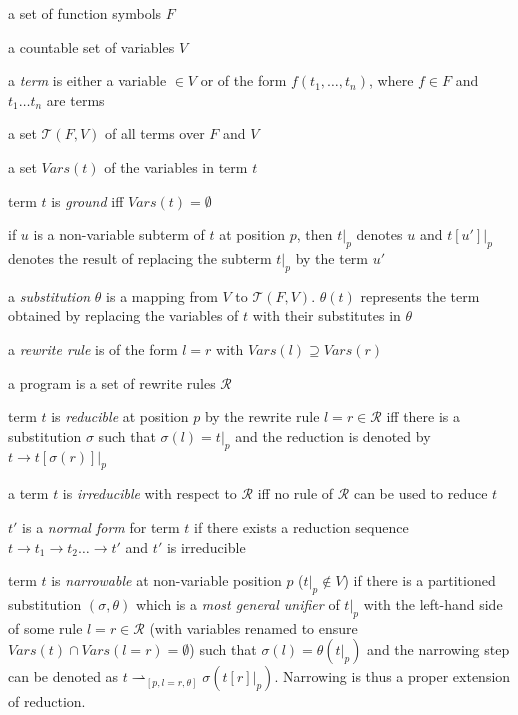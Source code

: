 \begin{list}{}{\setlength{\itemsep}{0cm}}
\item{a set of function symbols $F$}
\item{a countable set of variables $V$}
\item{a \textit{term} is either a variable $\in V$ or
  of the form $f(t_1,\ldots,t_n)$, where $f \in F$ and
  $t_1 \ldots t_n$ are terms}
\item{a set $\mathcal{T}(F,V)$ of all terms over
  $F$ and $V$}
\item{a set $\mathit{Vars}(t)$ of the variables in term $t$}
\item{term $t$ is \textit{ground} iff $\mathit{Vars}(t) = \emptyset$}
\item{if $u$ is a non-variable subterm of $t$ at position $p$, then
  $t|_p$ denotes $u$ and $t[u']|_p$ denotes the result of replacing
  the subterm $t|_p$ by the term $u'$}
\item{a \textit{substitution} $\theta$ is a mapping from $V$ to
  $\mathcal{T}(F,V)$.  $\theta(t)$ represents the term obtained by
  replacing the variables of $t$ with their substitutes in $\theta$}
\item{a \textit{rewrite rule} is of the form $l = r$ with
  $\mathit{Vars}(l) \supseteq \mathit{Vars}(r)$}
\item{a program is a set of rewrite rules $\mathcal{R}$}
\item{term $t$ is \textit{reducible} at position $p$ by the rewrite rule
  $l = r \in \mathcal{R}$
  iff there is a substitution $\sigma$ such that $\sigma(l)=t|_p$ and
  the reduction is denoted by $t \rightarrow t[\sigma(r)]|_p$}
\item{a term $t$ is \textit{irreducible} with respect to $\mathcal{R}$
  iff no rule of $\mathcal{R}$ can be used to reduce $t$}
\item{$t'$ is a \textit{normal form} for term $t$ if there exists a
  reduction sequence $t \rightarrow t_1 \rightarrow t_2 \ldots
  \rightarrow t'$ and $t'$ is irreducible}
\item{term $t$ is \textit{narrowable} at non-variable position $p$
  ($t|_p \notin V$) if there is a partitioned substitution $(\sigma ,\theta )$
  which is
  a \textit{most general unifier} of $t|_p$ with the left-hand side of
  some rule $l = r \in \mathcal{R}$ (with variables renamed to ensure
  $\mathit{Vars}(t) \cap \mathit{Vars}(l = r) = \emptyset$)
  such that $\sigma(l)=\theta(t|_p)$ and
  the narrowing step can be denoted as
  $t \rightharpoonup_{[p,l=r,\theta]} \sigma(t[r]|_p)$.  Narrowing
  is thus a proper extension of reduction.}
\end{list}

